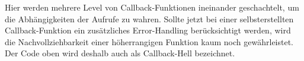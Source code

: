\noindent
Hier werden mehrere Level von Callback-Funktionen ineinander geschachtelt, um die Abhängigkeiten der Aufrufe zu wahren. Sollte jetzt bei einer selbsterstellten Callback-Funktion ein zusätzliches Error-Handling berücksichtigt werden, wird die Nachvollziehbarkeit einer höherrangigen Funktion kaum noch gewährleistet. Der Code oben wird deshalb auch als Callback-Hell bezeichnet.




